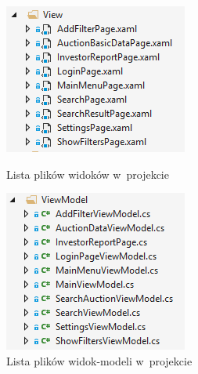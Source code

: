 \documentclass[a4paper,twoside,titlepage,openright]{book}
\begin{document}
\begin{figure}[h]
	\centering
	\begin{minipage}[h]{0.3\textwidth}
		\includegraphics[width=\textwidth]{listawidokow.png}
		\caption{Lista plików widoków w~projekcie}
	\end{minipage}
\hspace*{60px}
	\begin{minipage}[h]{0.3\textwidth}
		\includegraphics[width=\textwidth]{listaviewmodeli.png}
		\caption{Lista plików widok-modeli w~projekcie}
	\end{minipage}
	\hfill
\end{figure}
\end{document}
